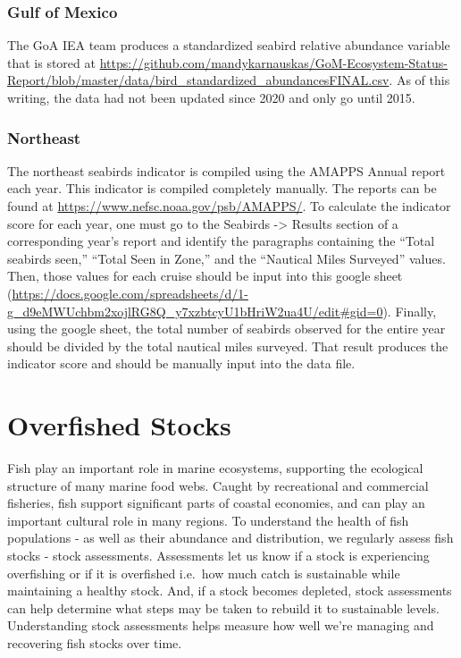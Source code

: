 \documentclass[
]{book}
\begin{document}
\hypertarget{gulf-of-mexico-2}{%
\subsection{Gulf of Mexico}\label{gulf-of-mexico-2}}

The GoA IEA team produces a standardized seabird relative abundance variable that is stored at \url{https://github.com/mandykarnauskas/GoM-Ecosystem-Status-Report/blob/master/data/bird_standardized_abundancesFINAL.csv}. As of this writing, the data had not been updated since 2020 and only go until 2015.

\hypertarget{northeast-2}{%
\subsection{Northeast}\label{northeast-2}}

The northeast seabirds indicator is compiled using the AMAPPS Annual report each year. This indicator is compiled completely manually. The reports can be found at \url{https://www.nefsc.noaa.gov/psb/AMAPPS/}. To calculate the indicator score for each year, one must go to the Seabirds -\textgreater{} Results section of a corresponding year's report and identify the paragraphs containing the ``Total seabirds seen,'' ``Total Seen in Zone,'' and the ``Nautical Miles Surveyed'' values. Then, those values for each cruise should be input into this google sheet (\url{https://docs.google.com/spreadsheets/d/1-g_d9eMWUchbm2xojlRG8Q_y7xzbtcyU1bHriW2ua4U/edit\#gid=0}). Finally, using the google sheet, the total number of seabirds observed for the entire year should be divided by the total nautical miles surveyed. That result produces the indicator score and should be manually input into the data file.

\hypertarget{overfished-stocks}{%
\chapter{Overfished Stocks}\label{overfished-stocks}}

Fish play an important role in marine ecosystems, supporting the ecological structure of many marine food webs. Caught by recreational and commercial fisheries, fish support significant parts of coastal economies, and can play an important cultural role in many regions. To understand the health of fish populations - as well as their abundance and distribution, we regularly assess fish stocks - stock assessments. Assessments let us know if a stock is experiencing overfishing or if it is overfished i.e.~how much catch is sustainable while maintaining a healthy stock. And, if a stock becomes depleted, stock assessments can help determine what steps may be taken to rebuild it to sustainable levels. Understanding stock assessments helps measure how well we're managing and recovering fish stocks over time.
\end{document}
